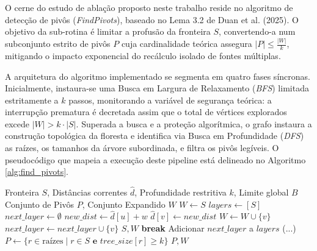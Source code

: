 \documentclass[10pt,a4paper]{article}
\begin{document}
O cerne do estudo de ablação proposto neste trabalho reside no algoritmo de detecção de pivôs (\textit{FindPivots}), baseado no Lema 3.2 de Duan et al. (2025). O objetivo da sub-rotina é limitar a profusão da fronteira $S$, convertendo-a num subconjunto estrito de pivôs $P$ cuja cardinalidade teórica assegura $|P| \le \frac{|W|}{k}$, mitigando o impacto exponencial do recálculo isolado de fontes múltiplas.

A arquitetura do algoritmo implementado se segmenta em quatro fases síncronas. Inicialmente, instaura-se uma Busca em Largura de Relaxamento (\textit{BFS}) limitada estritamente a $k$ passos, monitorando a variável de segurança teórica: a interrupção prematura é decretada assim que o total de vértices explorados excede $|W| > k \cdot |S|$. Superada a busca e a proteção algorítmica, o grafo instaura a construção topológica da floresta e identifica via Busca em Profundidade (\textit{DFS}) as raízes, os tamanhos da árvore subordinada, e filtra os pivôs legíveis. O pseudocódigo que mapeia a execução deste pipeline está delineado no Algoritmo \ref{alg:find_pivots}.

\begin{algorithm}[H]
\caption{Busca e Poda de Pivôs (Lema 3.2)}\label{alg:find_pivots}
\begin{algorithmic}[1]
\Require Fronteira $S$, Distâncias correntes $\hat{d}$, Profundidade restritiva $k$, Limite global $B$
\Ensure Conjunto de Pivôs $P$, Conjunto Expandido $W$
\State $W \gets S$
\State $layers \gets [S]$
    \State $next\_layer \gets \emptyset$
            \State $new\_dist \gets \hat{d}[u] + w$
                \State $\hat{d}[v] \gets new\_dist$
                    \State $W \gets W \cup \{v\}$
                    \State $next\_layer \gets next\_layer \cup \{v\}$
                \EndIf
            \EndIf
        \EndFor
    \EndFor
     
        \State \Return $S, W$
    \EndIf
        \State \textbf{break}
    \EndIf
    \State Adicionar $next\_layer$ a $layers$
\EndFor
{}
\State (...) 
\State $P \gets \{r \in \text{raízes} \mid r \in S \textbf{ e } tree\_size[r] \ge k\}$
\State \Return $P, W$
\end{algorithmic}
\end{algorithm}
\end{document}
